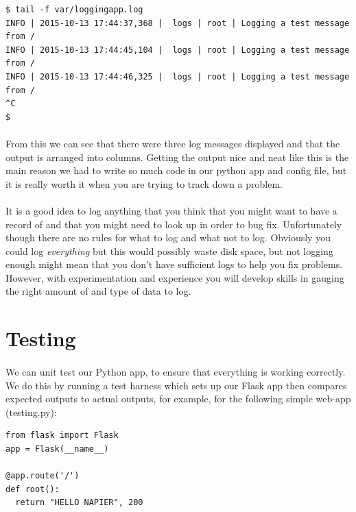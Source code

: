 \documentclass[12pt, a4paper, oneside]{book}
\begin{document}
{\begin{lstlisting}[style=DOS]
$ tail -f var/loggingapp.log 
INFO | 2015-10-13 17:44:37,368 |  logs | root | Logging a test message from /
INFO | 2015-10-13 17:44:45,104 |  logs | root | Logging a test message from /
INFO | 2015-10-13 17:44:46,325 |  logs | root | Logging a test message from /
^C
$ 
\end{lstlisting}

\paragraph{} From this we can see that there were three log messages displayed and that the output is arranged into columns. Getting the output nice and neat like this is the main reason we had to write so much code in our python app and config file, but it is really worth it when you are trying to track down a problem.

\paragraph{} It is a good idea to log anything that you think that you might want to have a record of and that you might need to look up in order to bug fix. Unfortunately though there are no rules for what to log and what not to log. Obviously you could log \emph{everything} but this would possibly waste disk space, but not logging enough might mean that you don't have sufficient logs to help you fix problems. However, with experimentation and experience you will develop skills in gauging the right amount of and type of data to log.

\section{Testing}
\label{testing}
\paragraph{} We can unit test our Python app, to ensure that everything is working correctly. We do this by running a test harness which sets up our Flask app then compares expected outputs to actual outputs, for example, for the following simple web-app (testing.py):

\begin{lstlisting}
from flask import Flask
app = Flask(__name__)

@app.route('/')
def root():
  return "HELLO NAPIER", 200


\end{lstlisting}}
\end{document}
